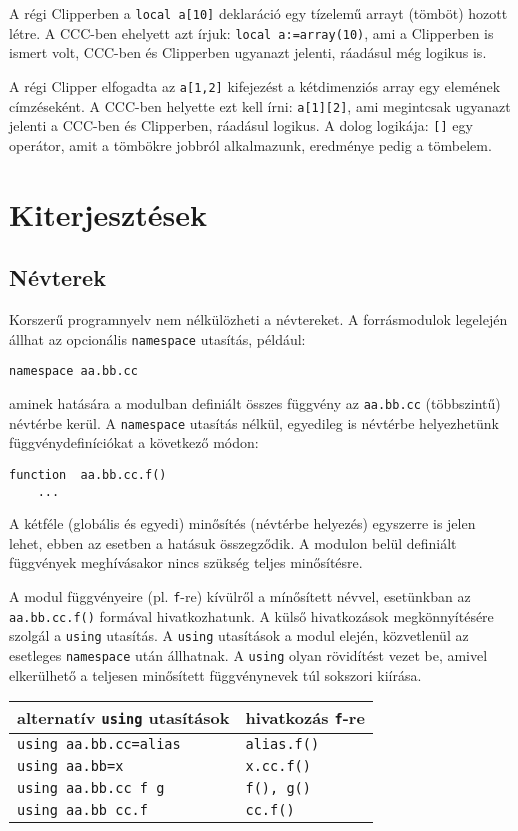 A régi Clipperben a \verb!local a[10]! deklaráció
egy tízelemű arrayt (tömböt) hozott létre. 
A CCC-ben ehelyett azt írjuk: \verb!local a:=array(10)!,
ami a Clipperben is ismert volt,  CCC-ben és Clipperben ugyanazt 
jelenti, ráadásul még logikus is.

A régi Clipper elfogadta az \verb!a[1,2]! kifejezést
a kétdimenziós array egy elemének címzéseként.
A CCC-ben helyette ezt kell írni: \verb!a[1][2]!, 
ami megintcsak ugyanazt jelenti a CCC-ben és Clipperben, 
ráadásul logikus. A dolog logikája:  \verb![]! egy operátor,
amit a tömbökre jobbról alkalmazunk, eredménye pedig a tömbelem.


\section{Kiterjesztések}




\label{NAMESPACE}
\subsection{Névterek}

Korszerű programnyelv nem nélkülözheti a névtereket.
A forrásmodulok legelején állhat az opcionális 
\verb!namespace! utasítás, például:
\begin{verbatim}
namespace aa.bb.cc
\end{verbatim}
aminek hatására a modulban definiált összes függvény
az \verb!aa.bb.cc! (többszintű) névtérbe kerül.
A \verb!namespace! utasítás nélkül, egyedileg is névtérbe 
helyezhetünk függvénydefiníciókat a következő módon:
\begin{verbatim}
function  aa.bb.cc.f()
    ...
\end{verbatim}
A kétféle (globális és egyedi) minősítés (névtérbe helyezés) 
egyszerre is jelen lehet, ebben az esetben a hatásuk összegződik.
A modulon belül definiált függvények meghívásakor
nincs szükség teljes minősítésre.

A modul függvényeire (pl. \verb!f!-re) kívülről a mínősített névvel,
esetünkban az \verb!aa.bb.cc.f()! formával hivatkozhatunk.
A külső hivatkozások megkönnyítésére szolgál a \verb!using! utasítás.
A \verb!using! utasítások a modul elején, közvetlenül az
esetleges \verb!namespace! után állhatnak. A \verb!using! olyan 
rövidítést vezet be, amivel elkerülhető a teljesen minősített 
függvénynevek túl sokszori kiírása.

\begin{center}
\begin{tabular}{|l|l|}\hline
alternatív {\tt using} utasítások   &  hivatkozás {\tt f}-re \\ \hline \hline
\tt  using aa.bb.cc=alias           &  \tt  alias.f() \\ \hline
\tt  using aa.bb=x                  &  \tt  x.cc.f() \\ \hline
\tt  using aa.bb.cc  f g            &  \tt  f(), g() \\ \hline
\tt  using aa.bb  cc.f              &  \tt  cc.f() \\ \hline
\end{tabular}
\end{center}

